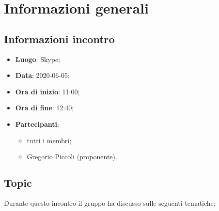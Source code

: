 \section{Informazioni generali}
\subsection{Informazioni incontro}
\begin{itemize}
	\item \textbf{Luogo}: Skype;
	\item \textbf{Data}: 2020-06-05;
	\item \textbf{Ora di inizio}: 11:00;
	\item \textbf{Ora di fine}: 12:40;
	\item \textbf{Partecipanti}:
	\begin{itemize}
		\item tutti i membri;
		\item Gregorio Piccoli (proponente).
	\end{itemize}
\end{itemize}

\subsection{Topic}
Durante questo incontro il gruppo ha discusso sulle seguenti tematiche:
